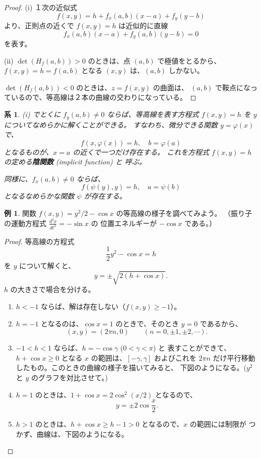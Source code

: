 \documentclass[a4paper]{jsarticle}
\newtheorem{Corollary}[Theorem]{系}
\theoremstyle{definition}
\newtheorem{Example}[Theorem]{例}
\theoremstyle{remark}
\begin{document}
\begin{proof}
(i) １次の近似式
\[
f(x,y) = h + f_x(a,b)(x-a) + f_y(y-b)
\]
より、正則点の近くで $f(x,y) = h$ は近似的に直線
\[
f_x(a,b)(x-a) + f_y(a,b)(y-b) = 0
\]
を表す。

(ii) $\det(H_f(a,b))>0$ のときは、点 $(a,b)$ で極値をとるから、
$f(x,y) = h = f(a,b)$ となる $(x,y)$ は、$(a,b)$ しかない。

$\det(H_f(a,b)) < 0$ のときは、$z = f(x,y)$ の曲面は、
$(a,b)$ で鞍点になっているので、等高線は２本の曲線の交わりになっている。
\end{proof}

\begin{Corollary}
{\rm (i)} でとくに $f_y(a,b) \not= 0$ ならば、等高線を表す方程式 
$f(x,y) = h$ を $y$ についてなめらかに解くことができる。
すなわち、微分できる関数 $y = \varphi(x)$ で、
\[
f(x,\varphi(x)) = h, \quad b = \varphi(a)
\]
となるものが、$x = a$ の近くで一つだけ存在する。
これを方程式 $f(x,y) = h$ の定める{\bf 陰関数} {\rm (implicit function)} と
呼ぶ。

同様に、$f_x(a,b) \not= 0$ ならば、
\[
f(\psi(y),y) = h, \quad a = \psi(b)
\]
となるなめらかな関数 $\psi$ が存在する。
\end{Corollary}


\begin{Example}
関数 $f(x,y) = y^2/2 - \cos x$ の等高線の様子を調べてみよう。
（振り子の運動方程式 $\frac{d^2x}{dt^2} = - \sin x$ の
位置エネルギーが $-\cos x$ である。）
\end{Example}

\begin{proof}
等高線の方程式
\[
\frac{1}{2}y^2 - \cos x = h
\]
を $y$ について解くと、
\[
y = \pm \sqrt{2(h + \cos x)}.
\]
$h$ の大きさで場合を分ける。

\begin{enumerate}
\item
$h < -1$ ならば、解は存在しない（$f(x,y) \geq -1$）。
\item
$h = -1$ となるのは、$\cos x = 1$ のときで、そのとき $y = 0$ であるから、
\[
(x,y) = (2\pi n,0)
\qquad
(n = 0, \pm 1, \pm 2,\cdots).
\]
\item
$-1 < h < 1$ ならば、$h = - \cos \gamma$ ($0 < \gamma < \pi$) と
表すことができて、
$h + \cos x \geq 0$ となる $x$ の範囲は、$[-\gamma,\gamma]$ およびこれを
$2\pi n$ だけ平行移動したもの。このときの曲線の様子を描いてみると、
下図のようになる。($y^2$ と $y$ のグラフを対比させて。)
\item
$h=1$ のときは、$1+\cos x = 2\cos^2(x/2)$ となるので、
\[
y = \pm 2\cos\frac{x}{2}.
\]
\item
$h>1$ のときは、$h + \cos x \geq h-1>0$ となるので、$x$ の範囲には制限が
つかず、曲線は、下図のようになる。
\end{enumerate}
\end{proof}
\end{document}
